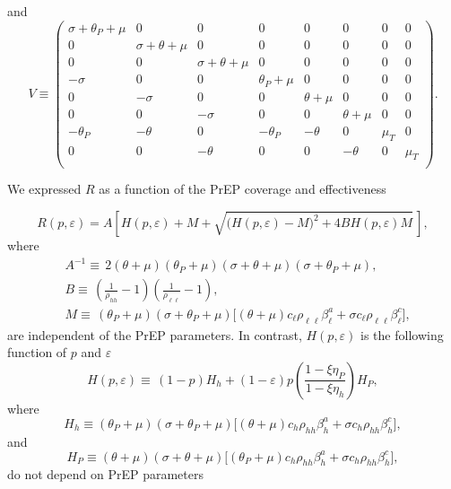 \documentclass[12pt]{article}
\begin{document}
 and 
\begin{equation} \label{eq:matrixV}
V \equiv \left(
\begin{array}{cccccccc}
\sigma +\theta_P +  \mu  & 0 & 0 & 0 & 0 & 0 & 0 & 0 \\
 0 & \sigma + \theta +\mu  & 0 & 0 & 0 & 0 & 0 & 0 \\
 0 & 0 & \sigma + \theta +\mu  & 0 & 0 & 0 & 0 & 0 \\
  -\sigma  & 0 & 0 & \theta_P + \mu & 0 & 0 & 0 & 0 \\
 0 & -\sigma  & 0 & 0 & \theta +\mu  & 0 & 0 & 0 \\
 0 & 0 & -\sigma  & 0 & 0 & \theta +\mu  & 0 & 0 \\
 -\theta_P & -\theta  & 0 & -\theta_P &  -\theta  & 0 & \mu_T& 0 \\
 0 & 0 & -\theta  & 0 & 0 & -\theta  & 0& \mu_T \\
\end{array}
\right).
\end{equation}


{We expressed $R$ as a function of the PrEP coverage and effectiveness}

\begin{equation}
	R(p,\varepsilon) = A \left[ H(p,\varepsilon) + M + \sqrt{ \Big(H(p,\varepsilon) - M\Big)^2 + 4 B H(p,\varepsilon) M }\,\right],
\end{equation}
where 
\begin{align} 
	& A^{-1} \equiv \, 2 (\theta+\mu) (\theta_P+\mu) (\sigma+\theta+\mu) (\sigma+\theta_P+\mu),\\
	& B \equiv \, \left(\frac{1}{\rho_{h h}}-1\right) \left(\frac{1}{\rho_{\ell \ell}}-1\right),\\
	& M \equiv \, (\theta_P+\mu) (\sigma+\theta_P+\mu) \Big[(\theta+\mu) c_\ell \rho_{\ell \ell}\beta_\ell^a+\sigma c_\ell \rho_{\ell \ell}\beta_\ell^c\Big], \end{align}
are independent of the PrEP parameters. In contrast, $H(p,\varepsilon)$ is the following function of $p$ and $\varepsilon$
\begin{equation}
	H(p,\varepsilon) \equiv \, (1-p) H_h +(1-\varepsilon) p \left( \frac{1-\xi \eta_P}{1-\xi \eta_h}\right) H_P,
\end{equation}
where
\begin{equation}
H_h \equiv (\theta_P+\mu) (\sigma+\theta_P+\mu) \Big[ (\theta+\mu) c_h \rho_{hh} \beta_h^a + \sigma c_h \rho_{hh} \beta_h^c \Big],
\end{equation}
and
\begin{equation}
H_P \equiv (\theta+\mu) (\sigma+\theta+\mu) \Big[ (\theta_P+\mu) c_h \rho_{hh} \beta_h^a + \sigma c_h \rho_{hh} \beta_h^c\Big],
\end{equation}
do not depend on PrEP parameters
\end{document}
